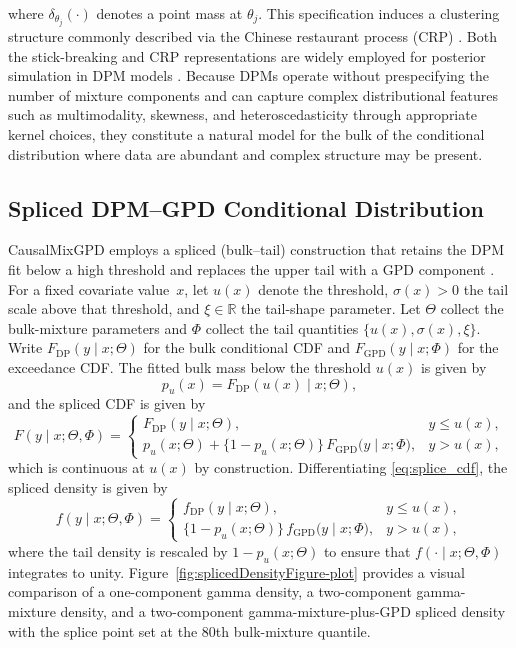 \documentclass[article]{jss}\usepackage[]{graphicx}\usepackage[]{xcolor}
\DeclareRobustCommand{\pkg}[1]{\textsf{#1}}
\begin{document}
where $\delta_{\theta_j}(\cdot)$ denotes a point mass at $\theta_j$.
This specification induces a clustering structure commonly described
via the Chinese restaurant process (CRP) \citep{Neal2000}.  Both the
stick-breaking and CRP representations are widely employed for
posterior simulation in DPM models
\citep{EscobarWest1995,Neal2000}.  Because DPMs operate without
prespecifying the number of mixture components and can capture complex
distributional features such as multimodality, skewness, and
heteroscedasticity through appropriate kernel choices, they constitute
a natural model for the bulk of the conditional distribution where data
are abundant and complex structure may be present.


\subsection{Spliced DPM--GPD Conditional Distribution}
\label{subsec:splice}

\pkg{CausalMixGPD} employs a spliced (bulk--tail) construction that
retains the DPM fit below a high threshold and replaces the upper tail
with a GPD component
\citep{Frigessi2002,Behrens2004,Coles2001}.  For a fixed covariate
value~$x$, let $u(x)$ denote the threshold, $\sigma(x)>0$ the tail
scale above that threshold, and $\xi\in\mathbb{R}$ the tail-shape
parameter.  Let $\Theta$ collect the bulk-mixture parameters and
$\Phi$ collect the tail quantities $\{u(x),\sigma(x),\xi\}$.  Write
$F_{\mathrm{DP}}(y\mid x;\Theta)$ for the bulk conditional CDF and
$F_{\mathrm{GPD}}(y\mid x;\Phi)$ for the exceedance CDF.  The fitted bulk mass below the threshold $u(x)$ is given by
\begin{equation}
p_u(x)=F_{\mathrm{DP}}(u(x)\mid x;\Theta),
\label{eq:pu_theta}
\end{equation}
and the spliced CDF is given by
\begin{equation}
F(y\mid x;\Theta,\Phi)=
\begin{cases}
F_{\mathrm{DP}}(y\mid x;\Theta), & y \le u(x),\\[6pt]
p_u(x;\Theta)
+
\bigl\{1-p_u(x;\Theta)\bigr\}\,
F_{\mathrm{GPD}}\!\bigl(y\mid x;\Phi\bigr),
& y>u(x),
\end{cases}
\label{eq:splice_cdf}
\end{equation}
which is continuous at $u(x)$ by construction.  Differentiating
\eqref{eq:splice_cdf}, the spliced density is given by
\begin{equation}
f(y\mid x;\Theta,\Phi)=
\begin{cases}
f_{\mathrm{DP}}(y\mid x;\Theta), & y \le u(x),\\[8pt]
\bigl\{1-p_u(x;\Theta)\bigr\}\,
f_{\mathrm{GPD}}\!\bigl(y\mid x;\Phi\bigr),
& y>u(x),
\end{cases}
\label{eq:splice_pdf}
\end{equation}
where the tail density is rescaled by $1-p_u(x;\Theta)$ to ensure that
$f(\cdot\mid x;\Theta,\Phi)$ integrates to unity.
Figure~\ref{fig:splicedDensityFigure-plot} provides a visual
comparison of a one-component gamma density, a two-component
gamma-mixture density, and a two-component gamma-mixture-plus-GPD
spliced density with the splice point set at the 80th bulk-mixture
quantile.
\end{document}
